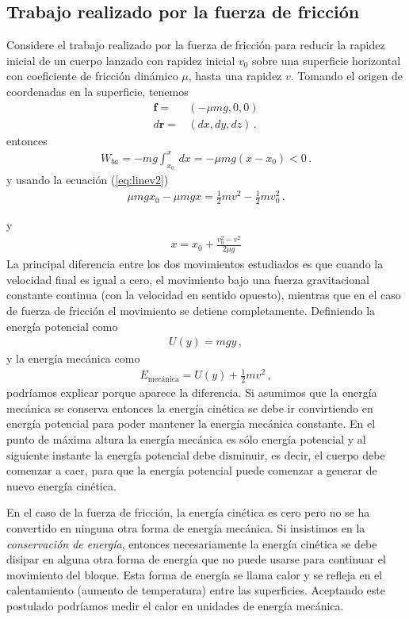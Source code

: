 \subsection{Trabajo realizado por la fuerza de fricción}
\begin{frame}
  Considere el trabajo realizado por la fuerza de fricción para reducir
la rapidez inicial de un cuerpo lanzado con rapidez inicial $v_0$
sobre una superficie horizontal con coeficiente de fricción dinámico
$\mu$, hasta una rapidez $v$. Tomando el origen de coordenadas en la
superficie, tenemos
\begin{align*}
  \mathbf{f}=&(-\mu m g,0,0)\nonumber\\
  d\mathbf{r}=&(dx,dy,dz)\,.
\end{align*}
entonces
\begin{align*}
  W_{ba}=-mg\int_{x_0}^x\,dx=-\mu mg(x-x_0)<0\,.
\end{align*}
y usando la ecuación (\ref{eq:linev2})
\begin{align*}
  \mu mgx_0-\mu mgx=\tfrac{1}{2}m v^2-\tfrac{1}{2}m v_0^2\,.
\end{align*}
\end{frame}
y
\begin{align}
x=x_0+\frac{v_0^2-v^2}{2\mu g}
\end{align}
La principal diferencia entre los dos movimientos estudiados es que
cuando la velocidad final es igual a cero, el movimiento bajo una
fuerza gravitacional constante continua (con la velocidad en sentido
opuesto), mientras que en el caso de fuerza de fricción el movimiento
se detiene completamente. Definiendo la energía potencial como
\begin{align*}
  U(y)=mg y\,,
\end{align*}
y la energía mecánica como
\begin{align*}
  E_{\text{mecánica}}=U(y)+\tfrac{1}{2}m v^2\,,
\end{align*}
podríamos explicar porque aparece la diferencia. Si asumimos que la
energía mecánica se conserva entonces la energía cinética se debe ir
convirtiendo en energía potencial para poder mantener la energía
mecánica constante. En el punto de máxima altura la energía mecánica
es sólo energía potencial y al siguiente instante la energía potencial
debe disminuir, es decir, el cuerpo debe comenzar a caer, para que la
energía potencial puede comenzar a generar de nuevo energía cinética. 

En el caso de la fuerza de fricción, la energía cinética es cero pero
no se ha convertido en ninguna otra forma de energía mecánica. Si
insistimos en la \emph{conservación de energía}, entonces
necesariamente la energía cinética se debe disipar en alguna otra
forma de energía que no puede usarse para continuar el movimiento del
bloque. Esta forma de energía se llama calor y se refleja en el
calentamiento (aumento de temperatura) entre las
superficies. Aceptando este postulado podríamos medir el calor en
unidades de energía mecánica. 

